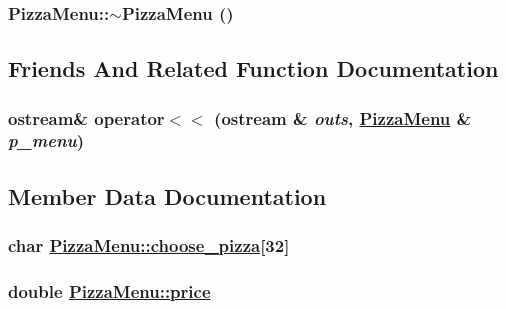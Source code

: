 \hypertarget{class_pizza_menu_e29c121e0c9e4357894f64d04b8a4ea6}{
\subsubsection[$\sim$PizzaMenu]{\setlength{\rightskip}{0pt plus 5cm}Pizza\-Menu::$\sim$Pizza\-Menu ()}}
\label{class_pizza_menu_e29c121e0c9e4357894f64d04b8a4ea6}




\subsection{Friends And Related Function Documentation}
\hypertarget{class_pizza_menu_09ec739bea659a73825966761529e5d7}{
\subsubsection[operator$<$$<$]{\setlength{\rightskip}{0pt plus 5cm}ostream\& operator$<$$<$ (ostream \& {\em outs}, \hyperlink{class_pizza_menu}{Pizza\-Menu} \& {\em p\_\-menu})}}
\label{class_pizza_menu_09ec739bea659a73825966761529e5d7}




\subsection{Member Data Documentation}
\hypertarget{class_pizza_menu_04a00e7cbd548718d71a7c6afccae12f}{
\subsubsection[choose\_\-pizza]{\setlength{\rightskip}{0pt plus 5cm}char \hyperlink{class_pizza_menu_04a00e7cbd548718d71a7c6afccae12f}{Pizza\-Menu::choose\_\-pizza}\mbox{[}32\mbox{]}}}
\label{class_pizza_menu_04a00e7cbd548718d71a7c6afccae12f}


\hypertarget{class_pizza_menu_78a5eb43deef9a7b5b9ce157b9d52ac4}{
\subsubsection[price]{\setlength{\rightskip}{0pt plus 5cm}double \hyperlink{class_pizza_menu_78a5eb43deef9a7b5b9ce157b9d52ac4}{Pizza\-Menu::price}}}
\label{class_pizza_menu_78a5eb43deef9a7b5b9ce157b9d52ac4}


